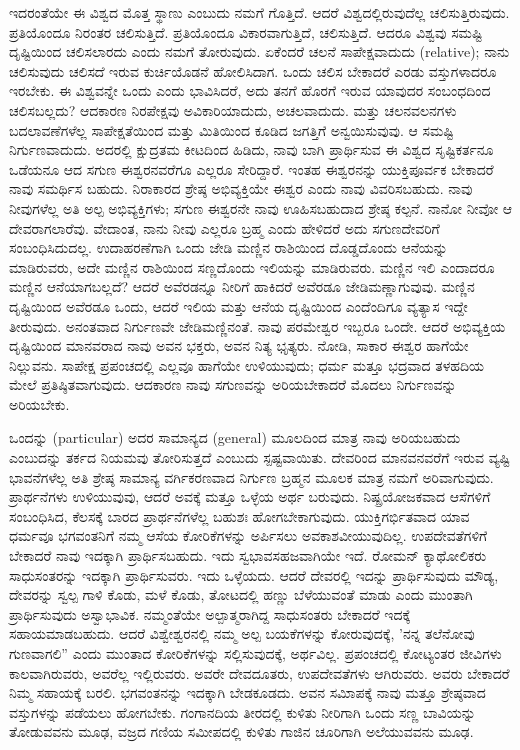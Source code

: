 ಇದರಂತೆಯೇ ಈ ವಿಶ್ವದ ಮೊತ್ತ ಸ್ಥಾಣು ಎಂಬುದು ನಮಗೆ ಗೊತ್ತಿದೆ. ಆದರೆ ವಿಶ್ವದಲ್ಲಿರುವುದೆಲ್ಲ ಚಲಿಸುತ್ತಿರುವುದು. ಪ್ರತಿಯೊಂದೂ ನಿರಂತರ ಚಲಿಸುತ್ತಿದೆ. ಪ್ರತಿಯೊಂದೂ ವಿಕಾರವಾಗುತ್ತಿದೆ, ಚಲಿಸುತ್ತಿದೆ. ಆದರೂ ವಿಶ್ವವು ಸಮಷ್ಟಿ ದೃಷ್ಟಿಯಿಂದ ಚಲಿಸಲಾರದು ಎಂದು ನಮಗೆ ತೋರುವುದು. ಏಕೆಂದರೆ ಚಲನೆ ಸಾಪೇಕ್ಷವಾದುದು (relative); ನಾನು ಚಲಿಸುವುದು ಚಲಿಸದೆ ಇರುವ ಕುರ್ಚಿಯೊಡನೆ ಹೋಲಿಸಿದಾಗ. ಒಂದು ಚಲಿಸ ಬೇಕಾದರೆ ಎರಡು ವಸ್ತುಗಳಾದರೂ ಇರಬೇಕು. ಈ ವಿಶ್ವವನ್ನೇ ಒಂದು ಎಂದು ಭಾವಿಸಿದರೆ, ಅದು ತನಗೆ ಹೊರಗೆ ಇರುವ ಯಾವುದರ ಸಂಬಂಧದಿಂದ ಚಲಿಸಬಲ್ಲದು? ಆದಕಾರಣ ನಿರಪೇಕ್ಷವು ಅವಿಕಾರಿಯಾದುದು, ಅಚಲವಾದುದು. ಮತ್ತು ಚಲನವಲನಗಳು ಬದಲಾವಣೆಗಳೆಲ್ಲ ಸಾಪೇಕ್ಷತೆಯಿಂದ ಮತ್ತು ಮಿತಿಯಿಂದ ಕೂಡಿದ ಜಗತ್ತಿಗೆ ಅನ್ವಯಿಸುವುವು. ಆ ಸಮಷ್ಟಿ ನಿರ್ಗುಣವಾದುದು. ಅದರಲ್ಲಿ ಕ್ಷುದ್ರತಮ ಕೀಟದಿಂದ ಹಿಡಿದು, ನಾವು ಬಾಗಿ ಪ್ರಾರ್ಥಿಸುವ ಈ ವಿಶ್ವದ ಸೃಷ್ಟಿಕರ್ತನೂ ಒಡೆಯನೂ ಆದ ಸಗುಣ ಈಶ್ವರನವರೆಗೂ ಎಲ್ಲರೂ ಸೇರಿದ್ದಾರೆ. ಇಂತಹ ಈಶ್ವರನನ್ನು ಯುಕ್ತಿಪೂರ್ವಕ ಬೇಕಾದರೆ ನಾವು ಸಮರ್ಥಿಸ ಬಹುದು. ನಿರಾಕಾರದ ಶ್ರೇಷ್ಠ ಅಭಿವ್ಯಕ್ತಿಯೇ ಈಶ್ವರ ಎಂದು ನಾವು ವಿವರಿಸಬಹುದು. ನಾವು ನೀವುಗಳೆಲ್ಲ ಅತಿ ಅಲ್ಪ ಅಭಿವ್ಯಕ್ತಿಗಳು; ಸಗುಣ ಈಶ್ವರನೇ ನಾವು ಊಹಿಸಬಹುದಾದ ಶ್ರೇಷ್ಠ ಕಲ್ಪನೆ. ನಾನೋ ನೀವೋ ಆ ದೇವರಾಗಲಾರೆವು. ವೇದಾಂತ, ನಾನು ನೀವು ಎಲ್ಲರೂ ಬ್ರಹ್ಮ ಎಂದು ಹೇಳಿದರೆ ಅದು ಸಗುಣದೇವರಿಗೆ ಸಂಬಂಧಿಸಿದುದಲ್ಲ. ಉದಾಹರಣೆಗಾಗಿ ಒಂದು ಜೇಡಿ ಮಣ್ಣಿನ ರಾಶಿಯಿಂದ ದೊಡ್ಡದೊಂದು ಆನೆಯನ್ನು ಮಾಡಿರುವರು, ಅದೇ ಮಣ್ಣಿನ ರಾಶಿಯಿಂದ ಸಣ್ಣದೊಂದು ಇಲಿಯನ್ನು ಮಾಡಿರುವರು. ಮಣ್ಣಿನ ಇಲಿ ಎಂದಾದರೂ ಮಣ್ಣಿನ ಆನೆಯಾಗಬಲ್ಲದೆ? ಆದರೆ ಅವೆರಡನ್ನೂ ನೀರಿಗೆ ಹಾಕಿದರೆ ಅವೆರಡೂ ಜೇಡಿಮಣ್ಣಾಗುವುವು. ಮಣ್ಣಿನ ದೃಷ್ಟಿಯಿಂದ ಅವೆರಡೂ ಒಂದು, ಆದರೆ ಇಲಿಯ ಮತ್ತು ಆನೆಯ ದೃಷ್ಟಿಯಿಂದ ಎಂದೆಂದಿಗೂ ವ್ಯತ್ಯಾಸ ಇದ್ದೇ ತೀರುವುದು. ಅನಂತವಾದ ನಿರ್ಗುಣವೇ ಜೇಡಿಮಣ್ಣಿನಂತೆ. ನಾವು ಪರಮೇಶ್ವರ ಇಬ್ಬರೂ ಒಂದೇ. ಆದರೆ ಅಭಿವ್ಯಕ್ತಿಯ ದೃಷ್ಟಿಯಿಂದ ಮಾನವರಾದ ನಾವು ಅವನ ಭಕ್ತರು, ಅವನ ನಿತ್ಯ ಭೃತ್ಯರು. ನೋಡಿ, ಸಾಕಾರ ಈಶ್ವರ ಹಾಗೆಯೇ ನಿಲ್ಲುವನು. ಸಾಪೇಕ್ಷ ಪ್ರಪಂಚದಲ್ಲಿ ಎಲ್ಲವೂ ಹಾಗೆಯೇ ಉಳಿಯುವುದು; ಧರ್ಮ ಮತ್ತೂ ಭದ್ರವಾದ ತಳಹದಿಯ ಮೇಲೆ ಪ್ರತಿಷ್ಠಿತವಾಗುವುದು. ಆದಕಾರಣ ನಾವು ಸಗುಣವನ್ನು ಅರಿಯಬೇಕಾದರೆ ಮೊದಲು ನಿರ್ಗುಣವನ್ನು ಅರಿಯಬೇಕು.

ಒಂದನ್ನು (particular) ಅದರ ಸಾಮಾನ್ಯದ (general) ಮೂಲದಿಂದ ಮಾತ್ರ ನಾವು ಅರಿಯಬಹುದು ಎಂಬುದನ್ನು ತರ್ಕದ ನಿಯಮವು ತೋರಿಸುತ್ತದೆ ಎಂಬುದು ಸ್ಪಷ್ಟವಾಯಿತು. ದೇವರಿಂದ ಮಾನವನವರೆಗೆ ಇರುವ ವ್ಯಷ್ಟಿ ಭಾವನೆಗಳೆಲ್ಲ ಅತಿ ಶ್ರೇಷ್ಠ ಸಾಮಾನ್ಯ ವರ್ಗಿಕರಣವಾದ ನಿರ್ಗುಣ ಬ್ರಹ್ಮನ ಮೂಲಕ ಮಾತ್ರ ನಮಗೆ ಅರಿವಾಗುವುದು. ಪ್ರಾರ್ಥನೆಗಳು ಉಳಿಯುವುವು, ಆದರೆ ಅವಕ್ಕೆ ಮತ್ತೂ ಒಳ್ಳೆಯ ಅರ್ಥ ಬರುವುದು. ನಿಷ್ಪ್ರಯೋಜಕವಾದ ಆಸೆಗಳಿಗೆ ಸಂಬಂಧಿಸಿದ, ಕೆಲಸಕ್ಕೆ ಬಾರದ ಪ್ರಾರ್ಥನೆಗಳೆಲ್ಲ ಬಹುಶಃ ಹೋಗಬೇಕಾಗುವುದು. ಯುಕ್ತಿಗರ್ಭಿತವಾದ ಯಾವ ಧರ್ಮವೂ ಭಗವಂತನಿಗೆ ನಮ್ಮ ಆಸೆಯ ಕೋರಿಕೆಗಳನ್ನು ಅರ್ಪಿಸಲು ಅವಕಾಶವೀಯುವುದಿಲ್ಲ. ಉಪದೇವತೆಗಳಿಗೆ ಬೇಕಾದರೆ ನಾವು ಇದಕ್ಕಾಗಿ ಪ್ರಾರ್ಥಿಸಬಹುದು. ಇದು ಸ್ವಭಾವಸಹಜವಾಗಿಯೇ ಇದೆ. ರೋಮನ್ ಕ್ಯಾಥೋಲಿಕರು ಸಾಧುಸಂತರನ್ನು ಇದಕ್ಕಾಗಿ ಪ್ರಾರ್ಥಿಸುವರು. ಇದು ಒಳ್ಳೆಯದು. ಆದರೆ ದೇವರಲ್ಲಿ ಇದನ್ನು ಪ್ರಾರ್ಥಿಸುವುದು ಮೌಡ್ಯ, ದೇವರನ್ನು ಸ್ವಲ್ಪ ಗಾಳಿ ಕೊಡು, ಮಳೆ ಕೊಡು, ತೋಟದಲ್ಲಿ ಹಣ್ಣು ಬೆಳೆಯುವಂತೆ ಮಾಡು ಎಂದು ಮುಂತಾಗಿ ಪ್ರಾರ್ಥಿಸುವುದು ಅಸ್ವಾಭಾವಿಕ. ನಮ್ಮಂತೆಯೇ ಅಲ್ಪಾತ್ಮರಾಗಿದ್ದ ಸಾಧುಸಂತರು ಬೇಕಾದರೆ ಇದಕ್ಕೆ ಸಹಾಯಮಾಡಬಹುದು. ಆದರೆ ವಿಶ್ವೇಶ್ವರನಲ್ಲಿ ನಮ್ಮ ಅಲ್ಪ ಬಯಕೆಗಳನ್ನು ಕೋರುವುದಕ್ಕೆ, 'ನನ್ನ ತಲೆನೋವು ಗುಣವಾಗಲಿ'' ಎಂದು ಮುಂತಾದ ಕೋರಿಕೆಗಳನ್ನು ಸಲ್ಲಿಸುವುದಕ್ಕೆ, ಅರ್ಥವಿಲ್ಲ. ಪ್ರಪಂಚದಲ್ಲಿ ಕೋಟ್ಯಂತರ ಜೀವಿಗಳು ಕಾಲವಾಗಿರುವರು, ಅವರೆಲ್ಲ ಇಲ್ಲಿರುವರು. ಅವರೇ ದೇವದೂತರು, ಉಪದೇವತೆಗಳು ಆಗಿರುವರು. ಅವರು ಬೇಕಾದರೆ ನಿಮ್ಮ ಸಹಾಯಕ್ಕೆ ಬರಲಿ. ಭಗವಂತನನ್ನು ಇದಕ್ಕಾಗಿ ಬೇಡಕೂಡದು. ಅವನ ಸಮಿಾಪಕ್ಕೆ ನಾವು ಮತ್ತೂ ಶ್ರೇಷ್ಠವಾದ ವಸ್ತುಗಳನ್ನು ಪಡೆಯಲು ಹೋಗಬೇಕು. ಗಂಗಾನದಿಯ ತೀರದಲ್ಲಿ ಕುಳಿತು ನೀರಿಗಾಗಿ ಒಂದು ಸಣ್ಣ ಬಾವಿಯನ್ನು ತೋಡುವವನು ಮೂಢ, ವಜ್ರದ ಗಣಿಯ ಸಮೀಪದಲ್ಲಿ ಕುಳಿತು ಗಾಜಿನ ಚೂರಿಗಾಗಿ ಅಲೆಯುವವನು ಮೂಢ.

